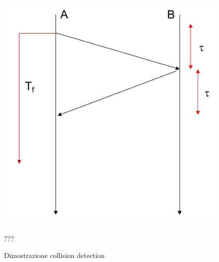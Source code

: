 \begin{figure}[htbp]
    \centering
    \begin{minipage}{0.5\textwidth}
        \includegraphics[width=\linewidth]{images/dimostrazionecsma.png}
        \caption{Dimostrazione collision detection}
        \label{fig:dimostrazione-csma}
    \end{minipage}%
    \hfill
    \begin{minipage}{0.45\textwidth}



???






    \end{minipage}
\end{figure}
